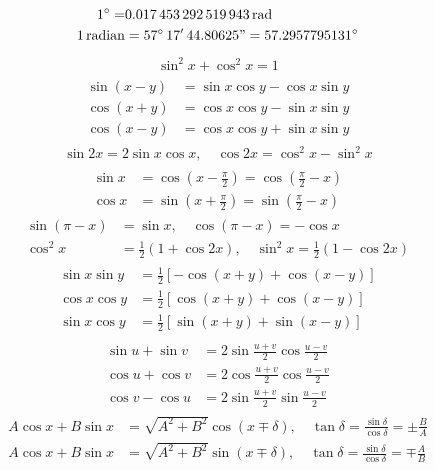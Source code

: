 %
\begin{align*}
1^{\circ}=&\SI{0.017453292519943}{\radian}\\
\SI{1}{radian}&=57^\circ\,17'\,44.80625"=57.2957795131^{\circ}
\end{align*}
%
\begin{align}
\sin^2x+\cos^2x=1
\end{align}
%
\begin{gather}
\begin{aligned}
\sin(x-y)&=\sin x\cos y-\cos x\sin y\\
\cos(x+y)&=\cos x\cos y-\sin x\sin y\\
\cos(x-y)&=\cos x\cos y+\sin x\sin y
\end{aligned}
\end{gather}
%
\begin{align}
\sin 2x=2\sin x\cos x, \quad \cos 2x=\cos^2x-\sin^2x
\end{align}
%
\begin{gather}
\begin{aligned}
\sin x&=\cos\left(x-\frac{\pi}{2}\right)=\cos\left(\frac{\pi}{2}-x\right)\\
\cos x&=\sin\left(x+\frac{\pi}{2}\right)=\sin\left(\frac{\pi}{2}-x\right)
\end{aligned}
\end{gather}
%
\begin{align}
\sin(\pi-x)&=\sin x,\quad \cos(\pi-x)=-\cos x\\
\cos^2x&=\frac{1}{2}(1+\cos 2x),\quad \sin^2x=\frac{1}{2}(1-\cos 2x)
\end{align}
%
\begin{gather}
\begin{aligned}
\sin x\sin y&=\frac{1}{2}[-\cos(x+y)+\cos(x-y)]\\
\cos x\cos y&=\frac{1}{2}[\cos(x+y)+\cos(x-y)]\\
\sin x\cos y&=\frac{1}{2}[\sin(x+y)+\sin(x-y)]
\end{aligned}
\end{gather}
%
\begin{gather}
\begin{aligned}
\sin u+\sin v&=2\sin \frac{u+v}{2}\cos\frac{u-v}{2}\\
\cos u+\cos v&=2\cos\frac{u+v}{2}\cos\frac{u-v}{2}\\
\cos v-\cos u&=2\sin\frac{u+v}{2}\sin\frac{u-v}{2}
\end{aligned}
\end{gather}
%
\begin{align}
A\cos x+B\sin x&=\sqrt{A^2+B^2}\cos(x\mp\delta),\quad \tan \delta=\frac{\sin \delta}{\cos \delta}=\pm \frac{B}{A}\\
A\cos x+B\sin x &=\sqrt{A^2+B^2}\sin(x\mp\delta),\quad \tan \delta=\frac{\sin \delta}{\cos \delta}=\mp\frac{A}{B}
\end{align}
